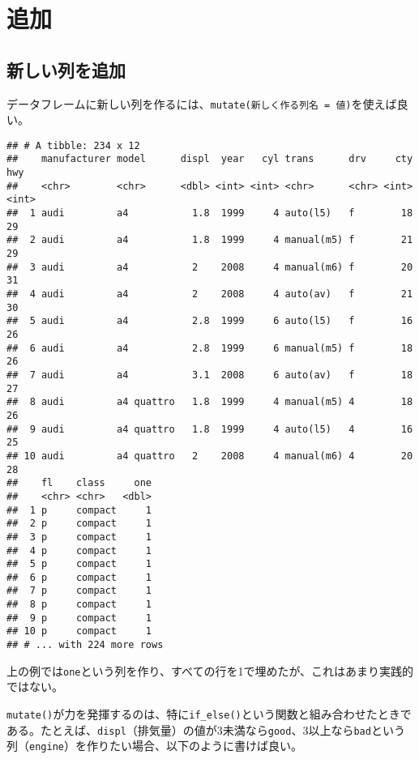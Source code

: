 \documentclass[]{book}
\newenvironment{Shaded}{\begin{snugshade}}{\end{snugshade}}
\newcommand{\KeywordTok}[1]{\textcolor[rgb]{0.13,0.29,0.53}{\textbf{#1}}}
\newcommand{\DataTypeTok}[1]{\textcolor[rgb]{0.13,0.29,0.53}{#1}}
\newcommand{\DecValTok}[1]{\textcolor[rgb]{0.00,0.00,0.81}{#1}}
\newcommand{\StringTok}[1]{\textcolor[rgb]{0.31,0.60,0.02}{#1}}
\newcommand{\CommentTok}[1]{\textcolor[rgb]{0.56,0.35,0.01}{\textit{#1}}}
\newcommand{\OperatorTok}[1]{\textcolor[rgb]{0.81,0.36,0.00}{\textbf{#1}}}
\newcommand{\NormalTok}[1]{#1}
\begin{document}
\section{追加}

\subsection{新しい列を追加}

データフレームに新しい列を作るには、\texttt{mutate(新しく作る列名\ =\ 値)}を使えば良い。

\begin{Shaded}
\end{Shaded}

\begin{verbatim}
## # A tibble: 234 x 12
##    manufacturer model      displ  year   cyl trans      drv     cty   hwy
##    <chr>        <chr>      <dbl> <int> <int> <chr>      <chr> <int> <int>
##  1 audi         a4           1.8  1999     4 auto(l5)   f        18    29
##  2 audi         a4           1.8  1999     4 manual(m5) f        21    29
##  3 audi         a4           2    2008     4 manual(m6) f        20    31
##  4 audi         a4           2    2008     4 auto(av)   f        21    30
##  5 audi         a4           2.8  1999     6 auto(l5)   f        16    26
##  6 audi         a4           2.8  1999     6 manual(m5) f        18    26
##  7 audi         a4           3.1  2008     6 auto(av)   f        18    27
##  8 audi         a4 quattro   1.8  1999     4 manual(m5) 4        18    26
##  9 audi         a4 quattro   1.8  1999     4 auto(l5)   4        16    25
## 10 audi         a4 quattro   2    2008     4 manual(m6) 4        20    28
##    fl    class     one
##    <chr> <chr>   <dbl>
##  1 p     compact     1
##  2 p     compact     1
##  3 p     compact     1
##  4 p     compact     1
##  5 p     compact     1
##  6 p     compact     1
##  7 p     compact     1
##  8 p     compact     1
##  9 p     compact     1
## 10 p     compact     1
## # ... with 224 more rows
\end{verbatim}

上の例では\texttt{one}という列を作り、すべての行を1で埋めたが、これはあまり実践的ではない。

\texttt{mutate()}が力を発揮するのは、特に\texttt{if\_else()}という関数と組み合わせたときである。たとえば、\texttt{displ}（排気量）の値が3未満なら\texttt{good}、3以上なら\texttt{bad}という列（\texttt{engine}）を作りたい場合、以下のように書けば良い。
\end{document}
